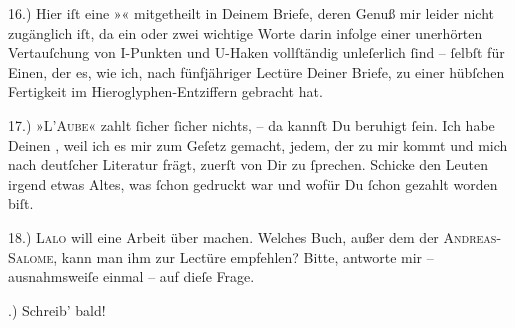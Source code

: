 \pstart
           {\pb}16.) Hier iſt eine »\label{K_L02774-9v}\label{K_L02774-9}« mitgetheilt in Deinem Briefe, deren Genuß mir leider nicht zugänglich iſt,
               da ein oder zwei wichtige Worte darin infolge einer unerhörten Vertauſchung von
               I-Punkten und U-Haken vollſtändig unleſerlich ſind – ſelbſt für Einen, der  es, wie ich, nach fünfjähriger Lectüre
               Deiner Briefe, zu einer hübſchen Fertigkeit im Hieroglyphen-Entziffern gebracht
               hat.\pend
           
\pstart
           {\pb}17.) »\textsc{L’Aube}« zahlt ſicher ſicher nichts, – da kannſt Du beruhigt ſein. Ich habe Deinen
                  \label{K_L02774-10v}\label{K_L02774-10}, weil ich es mir zum Geſetz \strikeout{\textcolor{gray}{ma}} gemacht, jedem, der zu mir kommt und mich nach deutſcher Literatur frägt,
               zuerſt von Dir zu ſprechen. Schicke den Leuten irgend etwas Altes, was ſchon gedruckt war und wofür
               Du ſchon gezahlt worden biſt.\pend
           
\pstart
           {\pb}18.) \textsc{Lalo} will eine Arbeit über \label{K_L02774-11v}\label{K_L02774-11} machen. Welches Buch, außer dem der \textsc{Andreas-Salome}, kann man ihm zur Lectüre empfehlen? Bitte, antworte mir – ausnahmsweiſe einmal
               – auf dieſe Frage.\pend
           
.) Schreib’ bald!\pend
           
